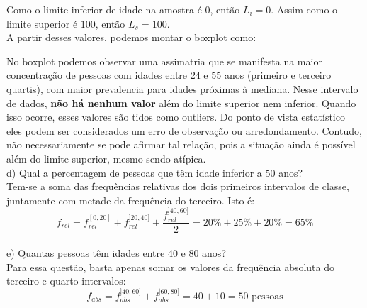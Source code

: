 Como o limite inferior de idade na amostra é $0$, então $L_i=0$. Assim como o limite superior é $100$, então $L_s=100$.
\\

A partir desses valores, podemos montar o boxplot como:


No boxplot podemos observar uma assimatria que se manifesta na maior concentração de pessoas com idades entre 24 e 55 anos (primeiro e terceiro quartis), com maior prevalencia para idades próximas à mediana. Nesse intervalo de dados, \textbf{não há nenhum valor} além do limite superior nem inferior. Quando isso ocorre, esses valores são tidos como outliers. Do ponto de vista estatístico eles podem ser considerados um erro de observação ou arredondamento. Contudo, não necessariamente se pode afirmar tal relação, pois a situação ainda é possível além do limite superior, mesmo sendo atípica.
\\

d) Qual a percentagem de pessoas que têm idade inferior a 50 anos?
\\

Tem-se a soma das frequências relativas dos dois primeiros intervalos de classe, juntamente com metade da frequência do terceiro. Isto é:
\\

\[
    f_{rel} = f_{rel}^{[0,20]}+f_{rel}^{]20,40]}+\frac{f_{rel}^{]40,60]}}{2}= 20\% + 25\% + 20\% = 65\%
\]
\\

e) Quantas pessoas têm idades entre 40 e 80 anos?
\\

Para essa questão, basta apenas somar os valores da frequência absoluta do terceiro e quarto intervalos:
\\

\[
    f_{abs} = f_{abs}^{]40,60]}+f_{abs}^{]60,80]}= 40+10 = 50\text{ pessoas}
\]
\\